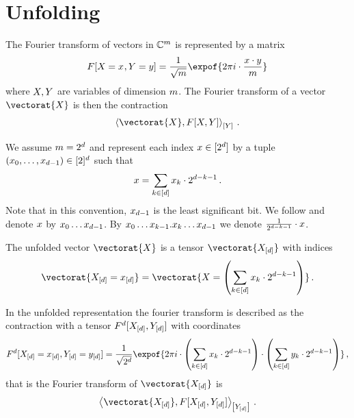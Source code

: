 \section{Unfolding}

The Fourier transform of vectors in $\mathbb{C}^{m}$ is represented by a matrix
\begin{align*}
    F[\indexedcatvariable,\headvariable=\headindex]
    = \frac{1}{\sqrt{\catdim}} \expof{2\pi i \cdot \frac{\catindex\cdot\headindex}{\catdim}}
\end{align*}
where $X,Y$ are variables of dimension $m$.
The Fourier transform of a vector $\vectorat{\catvariable}$ is then the contraction
\begin{align*}
    \contractionof{\vectorat{\catvariable},F[\catvariable,\headvariable]}{\headvariable} \, .
\end{align*}

We assume $m=2^{d}$ and represent each index $x\in[2^{d}]$ by a tuple $(x_{0},\ldots,x_{d-1})\in[2]^{d}$ such that
\begin{align*}
    x
    = \sum_{k\in[d]} x_{k} \cdot 2^{d-k-1} \, .
\end{align*}
Note that in this convention, $x_{d-1}$ is the least significant bit.
We follow \cite{nielsen_quantum_2010} and denote $x$ by $x_{0}\ldots x_{d-1}$.
By $x_{0}\ldots x_{k-1}.x_{k}\ldots x_{d-1}$ we denote $\frac{1}{2^{d-k-1}} \cdot x$.

The unfolded vector $\vectorat{\catvariable}$ is a tensor $\vectorat{\shortcatvariables}$ with indices
\begin{align*}
    \vectorat{\indexedshortcatvariables}
    = \vectorat{\catvariable=\left(\sum_{\catenumeratorin} \catindexof{\catenumerator} \cdot 2^{\catorder-\catenumerator-1}\right)} \, .
\end{align*}

In the unfolded representation the fourier transform is described as the contraction with a tensor $F^{d}[X_{[d]},Y_{[d]}]$ with coordinates
\begin{align*}
    F^{\catorder}[\indexedcatvariableof{[\catorder]},\indexedheadvariableof{[\catorder]}]
    = \frac{1}{\sqrt{2^\catorder}} \expof{2\pi i
    \cdot \left(\sum_{\catenumeratorin} \catindexof{\catenumerator} \cdot 2^{\catorder-\catenumerator-1}\right)
    \cdot \left(\sum_{\catenumeratorin} \headindexof{\catenumerator} \cdot 2^{\catorder-\catenumerator-1}\right)
    } \, ,
\end{align*}
that is the Fourier transform of $\vectorat{\shortcatvariables}$ is
\begin{align*}
    \contractionof{\vectorat{\shortcatvariables},F[\shortcatvariables,\headvariableof{[\catorder]}]}{\headvariableof{[\catorder]}} \, .
\end{align*}